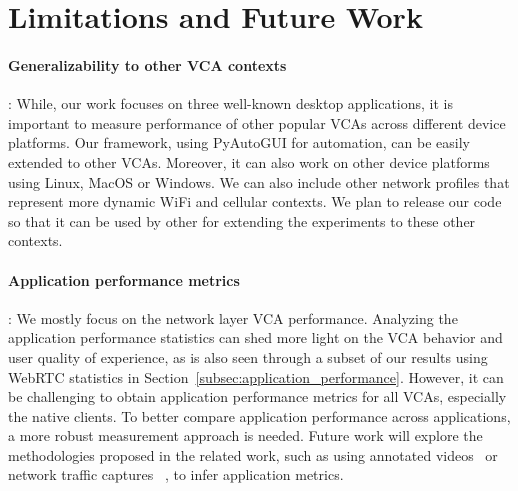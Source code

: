 \section{Limitations and Future Work}
\label{sec:discussion}

\paragraph{Generalizability to other VCA contexts}: While, our work focuses on three well-known desktop applications, it is important to measure performance of other popular VCAs across different device platforms. Our framework, using PyAutoGUI for automation, can be easily extended to other VCAs. Moreover, it can also work on other device platforms using Linux, MacOS or Windows. We can also include other network profiles that represent more dynamic WiFi and cellular contexts. We plan to release our code so that it can be used by other for extending the experiments to these other contexts.


\paragraph{Application performance metrics}: We mostly focus on the network layer VCA performance. Analyzing the application performance statistics can shed more light on the VCA behavior and user quality of experience, as is also seen through a subset of our results using WebRTC statistics in Section~\ref{subsec:application_performance}. However, it can be challenging to obtain application performance metrics for all VCAs, especially the native clients. To better compare application performance across applications, a more robust measurement approach is needed. Future work will explore the methodologies proposed in the related work, such as using annotated videos~\cite{xu2012video} or network traffic captures ~\cite{dasari2018scalable}, to infer application metrics.


